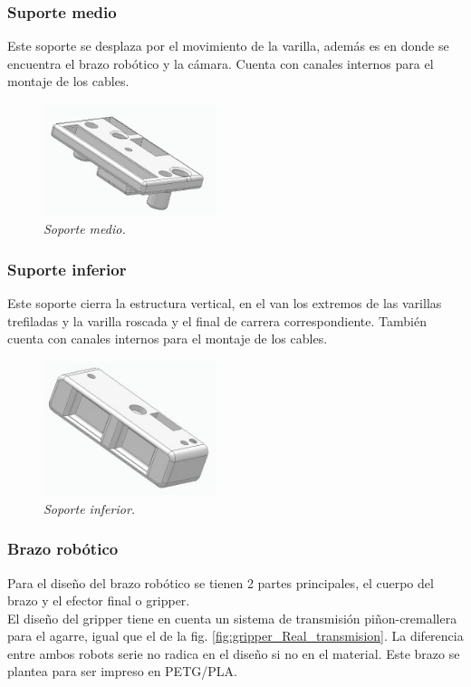 \subsubsection{Suporte medio}
Este soporte se desplaza por el movimiento de la varilla, además es en donde se encuentra el brazo robótico y la cámara. Cuenta con canales internos para el montaje de los cables. \\
\begin{figure}[H]
    \centering
\includegraphics[width=0.45\textwidth]{img/medio.jpg} \par
    \caption{\textit{Soporte medio.}}
    \label{fig:soporte_medio}
\end{figure}

\subsubsection{Suporte inferior}
Este soporte cierra la estructura vertical, en el van los extremos de las varillas trefiladas y la varilla roscada y el final de carrera correspondiente. También cuenta con canales internos para el montaje de los cables. \\
\begin{figure}[H]
    \centering
\includegraphics[width=0.45\textwidth]{img/inferior_completo.jpg} \par
    \caption{\textit{Soporte inferior.}}
    \label{fig:soporte_inferior}
\end{figure}

\subsubsection{Brazo robótico}
Para el diseño del brazo robótico se tienen 2 partes principales, el cuerpo del brazo y el efector final o gripper. \\
El diseño del gripper tiene en cuenta un sistema de transmisión piñon-cremallera para el agarre, igual que el de la  fig. \ref{fig:gripper_Real_transmision}. La diferencia entre ambos robots serie no radica en el diseño si no en el material. Este brazo se plantea para ser impreso en PETG/PLA.\\

